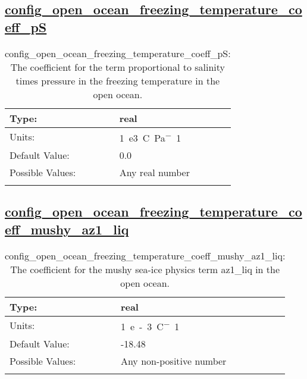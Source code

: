 \subsection[config\_open\_ocean\_freezing\_temperature\_coeff\_pS]{\hyperref[sec:nm_tab_eos]{config\_open\_ocean\_freezing\_temperature\_coeff\_pS}}
\label{subsec:nm_sec_config_open_ocean_freezing_temperature_coeff_pS}
\begin{center}
\begin{longtable}{| p{2.0in} || p{4.0in} |}
    \hline
    Type: & real \\
    \hline
    Units: & \si{1.e3.C.Pa^-1} \\
    \hline
    Default Value: & 0.0 \\
    \hline
    Possible Values: & Any real number \\
    \hline
    \caption{config\_open\_ocean\_freezing\_temperature\_coeff\_pS: The coefficient for the term proportional to salinity times pressure in the freezing temperature in the open ocean.}
\end{longtable}
\end{center}
\subsection[config\_open\_ocean\_freezing\_temperature\_coeff\_mushy\_az1\_liq]{\hyperref[sec:nm_tab_eos]{config\_open\_ocean\_freezing\_temperature\_coeff\_mushy\_az1\_liq}}
\label{subsec:nm_sec_config_open_ocean_freezing_temperature_coeff_mushy_az1_liq}
\begin{center}
\begin{longtable}{| p{2.0in} || p{4.0in} |}
    \hline
    Type: & real \\
    \hline
    Units: & \si{1.e-3.C^-1} \\
    \hline
    Default Value: & -18.48 \\
    \hline
    Possible Values: & Any non-positive number \\
    \hline
    \caption{config\_open\_ocean\_freezing\_temperature\_coeff\_mushy\_az1\_liq: The coefficient for the mushy sea-ice physics term az1\_liq in the open ocean.}
\end{longtable}
\end{center}

